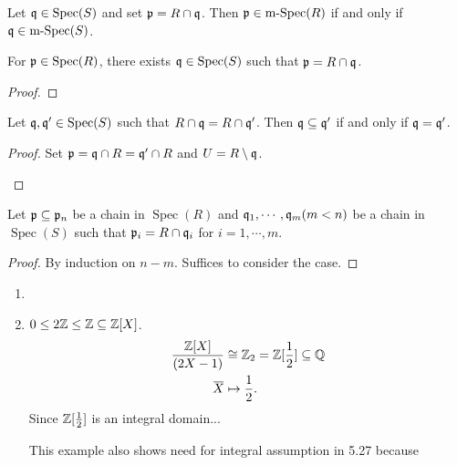 \begin{corollary}
    Let $\mathfrak{q} \in \operatorname{Spec}(S)$ and set $\mathfrak{p} = R \cap \mathfrak{q}$. Then $\mathfrak{p} \in \operatorname{m-Spec}(R)$ if and only if $\mathfrak{q} \in \operatorname{m-Spec}(S)$. 
\end{corollary}

\begin{theorem}
    For $\mathfrak{p} \in \operatorname{Spec}(R)$, there exists $\mathfrak{q} \in \operatorname{Spec}(S)$ such that $\mathfrak{p} = R \cap \mathfrak{q}$.
\end{theorem}

\begin{proof}
\end{proof}

\begin{proposition}
    Let $\mathfrak{q},\mathfrak{q}' \in \operatorname{Spec}(S)$ such that $R \cap \mathfrak{q} = R \cap \mathfrak{q}'$. Then $\mathfrak{q} \subseteq \mathfrak{q}'$ if and only if $\mathfrak{q} = \mathfrak{q}'$.
\end{proposition}

\begin{proof}
    Set $\mathfrak{p} = \mathfrak{q} \cap R = \mathfrak{q}' \cap R$ and $U = R \setminus \mathfrak{q}$. 
    \begin{center}
    \end{center}
\end{proof}

\begin{theorem}[Going up]
    Let $\mathfrak{p} \subseteq \mathfrak{p}_n$ be a chain in $\operatorname{Spec}(R)$ and $\mathfrak{q}_1,\cdots,\mathfrak{q}_m(m < n)$ be a chain in $\operatorname{Spec}(S)$ such that $\mathfrak{p}_i = R \cap \mathfrak{q}_i$ for $i = 1,\cdots,m$.
\end{theorem}

\begin{proof}
    By induction on $n-m$. Suffices to consider the case.
\end{proof}

\begin{example}
    \begin{enumerate}
        \item 
        \item $0 \leq 2\mathbb{Z} \leq \mathbb{Z} \subseteq \mathbb{Z}[X]$. 
            \begin{align*}
                \frac{\bbZ[X]}{(2X-1)} &\cong \bbZ_2 = \bbZ[\frac{1}{2}] \subseteq \bbQ \\
                \overbar{X} &\mapsto \frac{1}{2}.
            \end{align*}
            Since $\mathbb{Z}[\frac{1}{2}]$ is an integral domain... \par 
            This example also shows need for integral assumption in 5.27 because 
    \end{enumerate}
\end{example}

